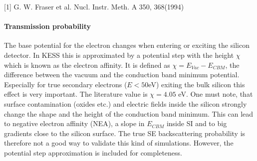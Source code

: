 \mbox{[}1\mbox{]} G. W. Fraser et al. Nucl. Instr. Meth. A 350, 368(1994)\hypertarget{_k_e_s_s_physics_KESSTransProb}{}\paragraph{Transmission probability}\label{_k_e_s_s_physics_KESSTransProb}
The base potential for the electron changes when entering or exciting the silicon detector. In KESS this is approximated by a potential step with the height $ \chi $ which is known as the electron affinity. It is defined as $ \chi = E_{Vac} - E_{CBM} $, the difference between the vacuum and the conduction band minimum potential. Especially for true secondary electrons ($E<50$eV) exiting the bulk silicon this effect is very important. The literature value is $ \chi = 4.05$ eV. One must note, that surface contamination (oxides etc.) and electric fields inside the silicon strongly change the shape and the height of the conduction band minimum. This can lead to negative electron affinity (NEA), a slope in $ E_{CBM} $ inside SI and to big gradients close to the silicon surface. The true SE backscattering probability is therefore not a good way to validate this kind of simulations. However, the potential step approximation is included for completeness.

